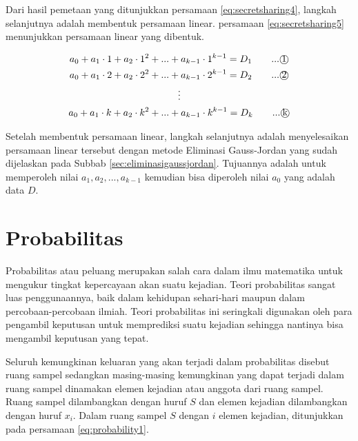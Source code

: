 Dari hasil pemetaan yang ditunjukkan persamaan \ref{eq:secretsharing4}, langkah selanjutnya adalah membentuk persamaan linear. persamaan \ref{eq:secretsharing5} menunjukkan persamaan linear yang dibentuk.

\begin{gather}
	a_0 + a_1\cdot 1 + a_2\cdot 1^2 + ... + a_{k-1}\cdot 1^{k-1} = D_1 \qquad...\text{\textcircled{1}} \nonumber \\
	a_0 + a_1\cdot 2 + a_2\cdot 2^2 + ... + a_{k-1}\cdot 2^{k-1} = D_2 \qquad...\text{\textcircled{2}} \nonumber \\
	\vdots \nonumber \\
	a_0 + a_1\cdot k + a_2\cdot k^2 + ... + a_{k-1}\cdot k^{k-1} = D_k \qquad...\text{\textcircled{k}} \label{eq:secretsharing5}
\end{gather}

Setelah membentuk persamaan linear, langkah selanjutnya adalah menyelesaikan persamaan linear tersebut dengan metode Eliminasi Gauss-Jordan yang sudah dijelaskan pada Subbab \ref{sec:eliminasigaussjordan}. Tujuannya adalah untuk memperoleh nilai \begin{math}a_1, a_2, ..., a_{k-1}\end{math} kemudian bisa diperoleh nilai \begin{math}a_0\end{math} yang adalah data \begin{math}D\end{math}.

\section{Probabilitas}
Probabilitas atau peluang merupakan salah cara dalam ilmu matematika untuk mengukur tingkat kepercayaan akan suatu kejadian. Teori probabilitas sangat luas penggunaannya, baik dalam kehidupan sehari-hari maupun dalam percobaan-percobaan ilmiah. Teori probabilitas ini seringkali digunakan oleh para pengambil keputusan untuk memprediksi suatu kejadian sehingga nantinya bisa mengambil keputusan yang tepat.

Seluruh kemungkinan keluaran yang akan terjadi dalam probabilitas disebut ruang sampel sedangkan masing-masing kemungkinan yang dapat terjadi dalam ruang sampel dinamakan elemen kejadian atau anggota dari ruang sampel. Ruang sampel dilambangkan dengan huruf \begin{math}S\end{math} dan elemen kejadian dilambangkan dengan huruf \begin{math}x_i\end{math}. Dalam ruang sampel \begin{math}S\end{math} dengan \begin{math}i\end{math} elemen kejadian, ditunjukkan pada persamaan \ref{eq:probability1}.

